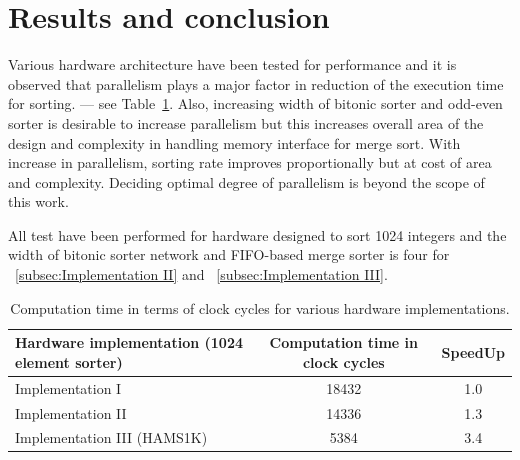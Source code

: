 \documentclass{article}
\begin{document}
\section{Results and conclusion}

Various hardware architecture have been tested for performance and it is observed that parallelism plays a major factor in reduction of the execution time for sorting.  --- see Table~\ref{tab:widgets}. Also, increasing width of bitonic sorter and odd-even sorter is desirable to increase parallelism but this increases overall area of the design and complexity in handling memory interface for merge sort. With  increase in parallelism, sorting rate improves proportionally but at cost of area and complexity.
Deciding optimal degree of parallelism is beyond the scope of this work.

All test have been performed for hardware designed to sort 1024 integers and the width of bitonic sorter network and FIFO-based merge sorter is four for ~\ref{subsec:Implementation II} and ~\ref{subsec:Implementation III}. 
\begin{table}[H]
\centering
\begin{tabular}{l|c|c}
Hardware implementation (1024 element sorter) & Computation time in clock cycles & SpeedUp \\\hline
Implementation I & 18432 & 1.0\\
Implementation II & 14336 & 1.3\\
Implementation III (HAMS1K) & 5384 & 3.4
\end{tabular}
\caption{\label{tab:widgets}Computation time in terms of clock cycles for various hardware implementations.}
\end{table}



\end{document}
